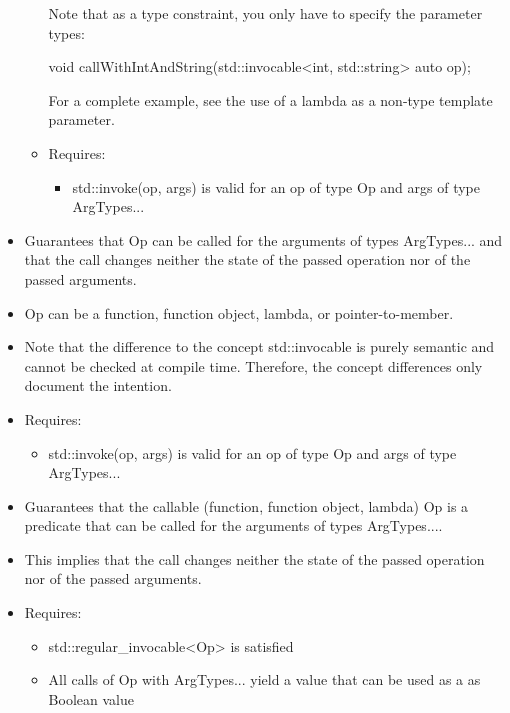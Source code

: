 \begin{itemize}
\begin{itemize}
Note that as a type constraint, you only have to specify the parameter types:

\begin{cpp}
void callWithIntAndString(std::invocable<int, std::string> auto op);
\end{cpp}

For a complete example, see the use of a lambda as a non-type template parameter.

\item
Requires:
\begin{itemize}
\item
std::invoke(op, args) is valid for an op of type Op and args of type ArgTypes...
\end{itemize}
\end{itemize}
\end{itemize}


\begin{itemize}
\item
Guarantees that Op can be called for the arguments of types ArgTypes... and that the call changes neither the state of the passed operation nor of the passed arguments.

\item
Op can be a function, function object, lambda, or pointer-to-member.

\item
Note that the difference to the concept std::invocable is purely semantic and cannot be checked at compile time. Therefore, the concept differences only document the intention.

\item
Requires:
\begin{itemize}
\item
std::invoke(op, args) is valid for an op of type Op and args of type ArgTypes...
\end{itemize}
\end{itemize}


\begin{itemize}
\item
Guarantees that the callable (function, function object, lambda) Op is a predicate that can be called for the arguments of types ArgTypes....

\item
This implies that the call changes neither the state of the passed operation nor of the passed arguments.

\item
Requires:
\begin{itemize}
\item
std::regular\_invocable<Op> is satisfied

\item
 All calls of Op with ArgTypes... yield a value that can be used as a as Boolean value
\end{itemize}
\end{itemize}

